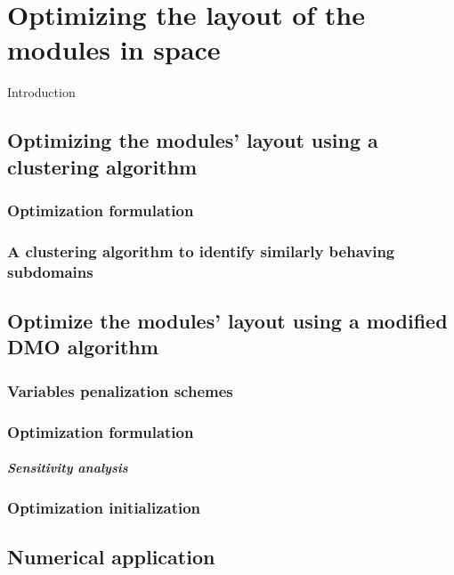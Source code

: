 \setchapterpreamble[u]{\margintoc}
\glsresetall %
\chapter{Optimizing the layout of the modules in space}
Introduction
\section{Optimizing the modules' layout using a clustering algorithm}

\subsection{Optimization formulation}

\subsection{A clustering algorithm to identify similarly behaving subdomains}

\section{Optimize the modules' layout using a modified DMO algorithm}


\subsection{Variables penalization schemes}

\subsection{Optimization formulation}

\paragraph{Sensitivity analysis}

\subsection{Optimization initialization}

\section{Numerical application}

